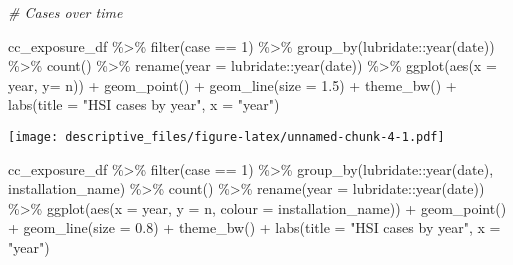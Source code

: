 \documentclass[
]{article}
\newenvironment{Shaded}{\begin{snugshade}}{\end{snugshade}}
\newcommand{\AttributeTok}[1]{\textcolor[rgb]{0.77,0.63,0.00}{#1}}
\newcommand{\CommentTok}[1]{\textcolor[rgb]{0.56,0.35,0.01}{\textit{#1}}}
\newcommand{\DecValTok}[1]{\textcolor[rgb]{0.00,0.00,0.81}{#1}}
\newcommand{\FloatTok}[1]{\textcolor[rgb]{0.00,0.00,0.81}{#1}}
\newcommand{\FunctionTok}[1]{\textcolor[rgb]{0.00,0.00,0.00}{#1}}
\newcommand{\NormalTok}[1]{#1}
\newcommand{\SpecialCharTok}[1]{\textcolor[rgb]{0.00,0.00,0.00}{#1}}
\newcommand{\StringTok}[1]{\textcolor[rgb]{0.31,0.60,0.02}{#1}}
\begin{document}
\begin{Shaded}
\begin{Highlighting}[]
\CommentTok{\# Cases over time}

\NormalTok{cc\_exposure\_df }\SpecialCharTok{\%\textgreater{}\%} 
  \FunctionTok{filter}\NormalTok{(case }\SpecialCharTok{==} \DecValTok{1}\NormalTok{) }\SpecialCharTok{\%\textgreater{}\%} 
  \FunctionTok{group\_by}\NormalTok{(lubridate}\SpecialCharTok{::}\FunctionTok{year}\NormalTok{(date)) }\SpecialCharTok{\%\textgreater{}\%} 
  \FunctionTok{count}\NormalTok{() }\SpecialCharTok{\%\textgreater{}\%} 
  \FunctionTok{rename}\NormalTok{(}\AttributeTok{year =} \StringTok{\textasciigrave{}}\AttributeTok{lubridate::year(date)}\StringTok{\textasciigrave{}}\NormalTok{) }\SpecialCharTok{\%\textgreater{}\%} 
  \FunctionTok{ggplot}\NormalTok{(}\FunctionTok{aes}\NormalTok{(}\AttributeTok{x =}\NormalTok{ year, }\AttributeTok{y=}\NormalTok{ n)) }\SpecialCharTok{+}
      \FunctionTok{geom\_point}\NormalTok{() }\SpecialCharTok{+}
      \FunctionTok{geom\_line}\NormalTok{(}\AttributeTok{size =} \FloatTok{1.5}\NormalTok{) }\SpecialCharTok{+}
      \FunctionTok{theme\_bw}\NormalTok{() }\SpecialCharTok{+}
  \FunctionTok{labs}\NormalTok{(}\AttributeTok{title =} \StringTok{"HSI cases by year"}\NormalTok{,}
       \AttributeTok{x =} \StringTok{"year"}\NormalTok{)}
\end{Highlighting}
\end{Shaded}

\texttt{[image: descriptive\_files/figure-latex/unnamed-chunk-4-1.pdf]}

\begin{Shaded}
\begin{Highlighting}[]
\NormalTok{cc\_exposure\_df }\SpecialCharTok{\%\textgreater{}\%} 
  \FunctionTok{filter}\NormalTok{(case }\SpecialCharTok{==} \DecValTok{1}\NormalTok{) }\SpecialCharTok{\%\textgreater{}\%} 
  \FunctionTok{group\_by}\NormalTok{(lubridate}\SpecialCharTok{::}\FunctionTok{year}\NormalTok{(date), installation\_name) }\SpecialCharTok{\%\textgreater{}\%} 
  \FunctionTok{count}\NormalTok{() }\SpecialCharTok{\%\textgreater{}\%} 
  \FunctionTok{rename}\NormalTok{(}\AttributeTok{year =} \StringTok{\textasciigrave{}}\AttributeTok{lubridate::year(date)}\StringTok{\textasciigrave{}}\NormalTok{) }\SpecialCharTok{\%\textgreater{}\%} 
  \FunctionTok{ggplot}\NormalTok{(}\FunctionTok{aes}\NormalTok{(}\AttributeTok{x =}\NormalTok{ year, }\AttributeTok{y =}\NormalTok{ n, }\AttributeTok{colour =}\NormalTok{ installation\_name)) }\SpecialCharTok{+}
      \FunctionTok{geom\_point}\NormalTok{() }\SpecialCharTok{+}
      \FunctionTok{geom\_line}\NormalTok{(}\AttributeTok{size =} \FloatTok{0.8}\NormalTok{) }\SpecialCharTok{+}
      \FunctionTok{theme\_bw}\NormalTok{() }\SpecialCharTok{+}
  \FunctionTok{labs}\NormalTok{(}\AttributeTok{title =} \StringTok{"HSI cases by year"}\NormalTok{,}
       \AttributeTok{x =} \StringTok{"year"}\NormalTok{)}
\end{Highlighting}
\end{Shaded}
\end{document}
